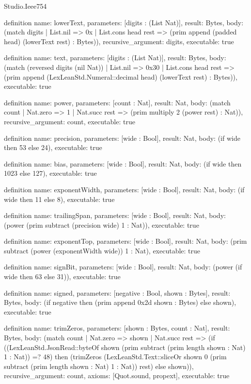 \begin{lexlean}{Studio.Ieee754}
\begin{semanticmodule}
definition{
  name: lowerText,
  parameters: [digits : (List Nat)],
  result: Bytes,
  body: (match digits
    | List.nil => 0x
    | List.cons head rest => (prim append (padded head) (lowerText rest) : Bytes)),
  recursive_argument: digits,
  executable: true
}

definition{
  name: text,
  parameters: [digits : (List Nat)],
  result: Bytes,
  body: (match (reversed digits (nil Nat))
    | List.nil => 0x30
    | List.cons head rest => (prim append (LexLeanStd.Numeral::decimal head) (lowerText rest) : Bytes)),
  executable: true
}

definition{
  name: power,
  parameters: [count : Nat],
  result: Nat,
  body: (match count
    | Nat.zero => 1
    | Nat.succ rest => (prim multiply 2 (power rest) : Nat)),
  recursive_argument: count,
  executable: true
}

definition{
  name: precision,
  parameters: [wide : Bool],
  result: Nat,
  body: (if wide then 53 else 24),
  executable: true
}

definition{
  name: bias,
  parameters: [wide : Bool],
  result: Nat,
  body: (if wide then 1023 else 127),
  executable: true
}

definition{
  name: exponentWidth,
  parameters: [wide : Bool],
  result: Nat,
  body: (if wide then 11 else 8),
  executable: true
}

definition{
  name: trailingSpan,
  parameters: [wide : Bool],
  result: Nat,
  body: (power (prim subtract (precision wide) 1 : Nat)),
  executable: true
}

definition{
  name: exponentTop,
  parameters: [wide : Bool],
  result: Nat,
  body: (prim subtract (power (exponentWidth wide)) 1 : Nat),
  executable: true
}

definition{
  name: signBit,
  parameters: [wide : Bool],
  result: Nat,
  body: (power (if wide then 63 else 31)),
  executable: true
}

definition{
  name: signed,
  parameters: [negative : Bool, shown : Bytes],
  result: Bytes,
  body: (if negative then (prim append 0x2d shown : Bytes) else shown),
  executable: true
}

definition{
  name: trimZeros,
  parameters: [shown : Bytes, count : Nat],
  result: Bytes,
  body: (match count
    | Nat.zero => shown
    | Nat.succ rest => (if ((LexLeanStd.JsonRead::byteOf shown (prim subtract (prim length shown : Nat) 1 : Nat)) =? 48) then (trimZeros (LexLeanStd.Text::sliceOr shown 0 (prim subtract (prim length shown : Nat) 1 : Nat)) rest) else shown)),
  recursive_argument: count,
  axioms: [Quot.sound, propext],
  executable: true
}


\end{semanticmodule}
\end{lexlean}
